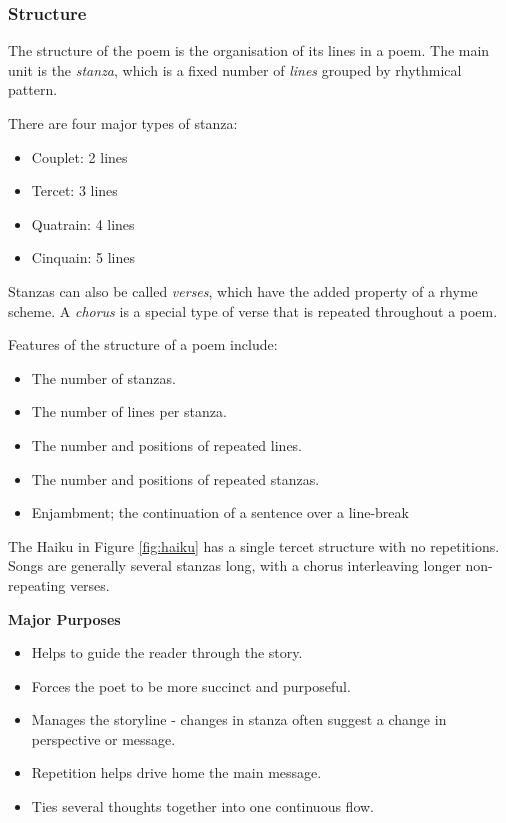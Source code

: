 \subsubsection{Structure}
\label{sec:structure}
The structure of the poem is the organisation of its lines in a poem. The main unit is the \textit{stanza}, which is a fixed number of \textit{lines} grouped by rhythmical pattern.

There are four major types of stanza:
\begin{itemize}
\item{Couplet: 2 lines}
\item{Tercet: 3 lines}
\item{Quatrain: 4 lines}
\item{Cinquain: 5 lines}
\end{itemize}

Stanzas can also be called \textit{verses}, which have the added property of a rhyme scheme. A \textit{chorus} is a special type of verse that is repeated throughout a poem.

Features of the structure of a poem include:
\begin{itemize}
\item{The number of stanzas.}
\item{The number of lines per stanza.}
\item{The number and positions of repeated lines.}
\item{The number and positions of repeated stanzas.}
\item{Enjambment; the continuation of a sentence over a line-break}
\end{itemize} 

The Haiku in Figure \ref{fig:haiku} has a single tercet structure with no repetitions. Songs are generally several stanzas long, with a chorus interleaving longer non-repeating verses.

\textbf{Major Purposes}
\begin{itemize}
\item{Helps to guide the reader through the story.}
\item{Forces the poet to be more succinct and purposeful.}
\item{Manages the storyline - changes in stanza often suggest a change in perspective or message.}
\item{Repetition helps drive home the main message.}
\item{Ties several thoughts together into one continuous flow.}
\end{itemize} 

